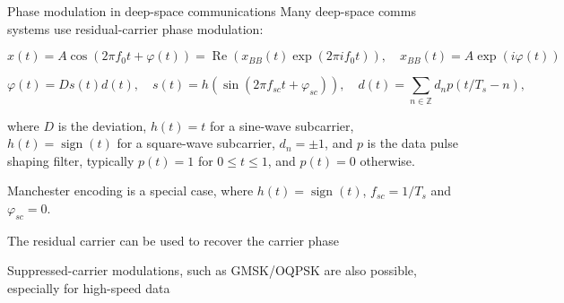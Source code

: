 \documentclass[aspectratio=169]{beamer}
\begin{document}
\begin{frame}{Phase modulation in deep-space communications}
  Many deep-space comms systems use residual-carrier phase modulation:

  \[
  x(t) = A\cos(2 \pi f_0 t + \varphi(t)) =
  \operatorname{Re}(x_{BB}(t) \exp(2 \pi i f_0 t)),\quad x_{BB}(t) = A\exp(i \varphi(t))
  \]

  \[
  \varphi(t) = D s(t) d(t), \quad s(t) = h(\sin(2 \pi f_{sc} t + \varphi_{sc})),
  \quad d(t) = \sum_{n \in \mathbb{Z}} d_n p(t/T_s - n),
  \]

  where $D$ is the deviation,
  $h(t) = t$ for a sine-wave subcarrier, $h(t) = \operatorname{sign}(t)$
  for a square-wave subcarrier, $d_n = \pm 1$, and $p$ is the data pulse shaping
  filter, typically $p(t) = 1$ for $0 \leq t \leq 1$, and $p(t) = 0$ otherwise.

  \medskip

  Manchester encoding is a special case, where $h(t) =
  \operatorname{sign}(t)$, $f_{sc} = 1/T_s$ and $\varphi_{sc} = 0$.
  
  \medskip
  
  The residual carrier can be used to recover the carrier phase

  \medskip

  Suppressed-carrier modulations, such as GMSK/OQPSK are also possible,
  especially for high-speed data
\end{frame}
\end{document}
